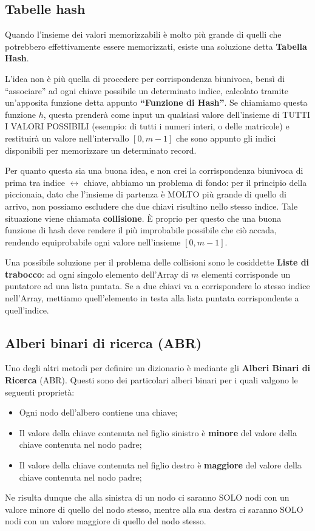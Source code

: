 \documentclass[12pt]{report}
\begin{document}
	\subsection{Tabelle hash}
	Quando l'insieme dei valori memorizzabili è molto più grande di quelli che potrebbero effettivamente essere memorizzati, esiste una soluzione detta \textbf{Tabella Hash}.
	
	L'idea non è più quella di procedere per corrispondenza biunivoca, bensì di ``associare'' ad ogni chiave possibile un determinato indice, calcolato tramite un'apposita funzione detta appunto \textbf{``Funzione di Hash''}. Se chiamiamo questa funzione $h$, questa prenderà come input un qualsiasi valore dell'insieme di TUTTI I VALORI POSSIBILI (esempio: di tutti i numeri interi, o delle matricole) e restituirà un valore nell'intervallo $[0, m-1]$ che sono appunto gli indici disponibili per memorizzare un determinato record.
	
	Per quanto questa sia una buona idea, e non crei la corrispondenza biunivoca di prima tra indice $\leftrightarrow$ chiave, abbiamo un problema di fondo: per il principio della piccionaia, dato che l'insieme di partenza è MOLTO più grande di quello di arrivo, non possiamo escludere che due chiavi risultino nello stesso indice. Tale situazione viene chiamata \textbf{collisione}. È proprio per questo che una buona funzione di hash deve rendere il più improbabile possibile che ciò accada, rendendo equiprobabile ogni valore nell'insieme $[0, m-1]$.
	
	Una possibile soluzione per il problema delle collisioni sono le cosiddette \textbf{Liste di trabocco}: ad ogni singolo elemento dell'Array di $m$ elementi corrisponde un puntatore ad una lista puntata. Se a due chiavi va a corrispondere lo stesso indice nell'Array, mettiamo quell'elemento in testa alla lista puntata corrispondente a quell'indice.
	
	\subsection{Alberi binari di ricerca (ABR)}
	Uno degli altri metodi per definire un dizionario è mediante gli \textbf{Alberi Binari di Ricerca} (ABR). Questi sono dei particolari alberi binari per i quali valgono le seguenti proprietà:
	\begin{itemize}
		\item Ogni nodo dell'albero contiene una chiave;
		\item Il valore della chiave contenuta nel figlio sinistro è \textbf{minore} del valore della chiave contenuta nel nodo padre;
		\item Il valore della chiave contenuta nel figlio destro è \textbf{maggiore} del valore della chiave contenuta nel nodo padre;
	\end{itemize}
	Ne risulta dunque che alla sinistra di un nodo ci saranno SOLO nodi con un valore minore di quello del nodo stesso, mentre alla sua destra ci saranno SOLO nodi con un valore maggiore di quello del nodo stesso.
	
\end{document}
